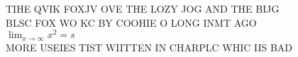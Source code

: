 \documentclass{article}%
\begin{document}
%
\normalsize%
TIHE QVIK FOXJV OVE THE LOZY JOG AND THE BIJG\\
BLSC FOX WO KC BY COOHIE O LONG INMT AGO\\
$\lim_{x \rightarrow \infty} x^{2} = s$\\
MORE USEIES TIST WIITTEN IN CHARPLC WHIC IIS BAD\\%
\end{document}
